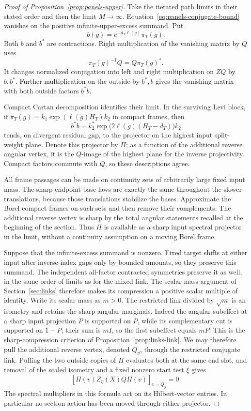 \begin{proof}[Proof of Proposition~\ref{prop:panels-upper}]
Take the iterated path limits in their stated order and then the limit
$M\to\infty$.  Equation~\eqref{eq:panels-conjugate-bound} vanishes on
the positive infinite-upper-excess summand.  Put
\[
 b(g)=e^{-d_T\ell(g)}\pi_T(g).
\]
Both $b$ and $b^*$ are contractions.  Right multiplication of the
vanishing matrix by $Q$ uses
\[
 \pi_T(g)^{-1}Q=Q\pi_T(g)^*.
\]
It changes normalized conjugation into left and right multiplication on
$ZQ$ by $b,b^*$.  Further multiplication on the outside by $b^*,b$
gives the vanishing matrix with both outside factors $b^*b$.

Compact Cartan decomposition identifies their limit.  In the surviving
Levi block, if $\pi_T(g)=k_1\exp(\ell(g)H_T)k_2$ in compact frames,
then
\[
 b^*b=k_2^*\exp\bigl(2\ell(g)(H_T-d_T)\bigr)k_2
\]
tends, on divergent residual gap, to the projector on the highest input
split-weight plane.  Denote this projector by $\Pi$; as a function of
the additional reverse angular vertex, it is the $Q$-image of the highest
plane for the inverse projectivity.  Compact factors commute with $Q$,
so these descriptions agree.

All frame passages can be made on continuity sets of arbitrarily large
fixed input mass.  The sharp endpoint base laws are exactly the same
throughout the slower translations, because those translations stabilize
the bases.  Approximate the Borel compact frames on such sets and then
remove their complements.  The additional reverse vertex is sharp by the
total angular statements recalled at the beginning of the section.
Thus $\Pi$ is available as a sharp input spectral projector in the
limit, without a continuity assumption on a moving Borel frame.

Suppose that the infinite-excess summand is nonzero.  Fixed target shifts
at either input alter inverse-index gaps only by bounded amounts, so
they preserve this summand.  The independent all-factor contracted
symmetries preserve it as well, in the same order of limits as for the
mixed link.  The scalar-mass argument of Section~\ref{sec:links}
therefore makes its compression a positive scalar multiple of identity.
Write its scalar mass as $m>0$.  The restricted link divided by
$\sqrt m$ is an isometry and retains the sharp angular marginals.
Indeed the angular subeffect at a sharp input projection $P$ is supported
on $P$, while its complementary cut is supported on $1-P$; their sum is
$mI$, so the first subeffect equals $mP$.  This is the sharp-compression
criterion of Proposition~\ref{prop:links-link}.  We may therefore pull the
additional reverse vertex, denoted $Q_y$, through the restricted conjugate
link.
Pulling the two outside copies of $\Pi$ evaluates both at the same end
slot, and removal of the scaled isometry and a fixed nonzero start test
$\xi$ gives
\begin{equation}\label{eq:panels-projector-vanishing}
 \left[\Pi(v)Z_\eta(X)Q\Pi(v)\right]_{v=Q_y}=0.
\end{equation}
The spectral multipliers in this formula act on its Hilbert-vector
entries.  In particular no section action has been moved through either
projector.


\end{proof}
